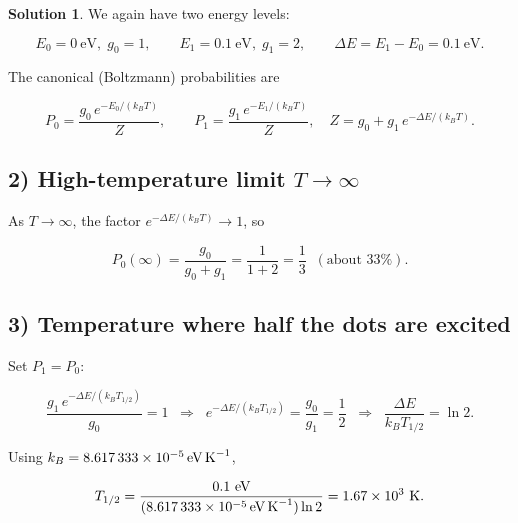 \documentclass[12pt]{article}
\theoremstyle{definition} %
\newtheorem{solution}{Solution}
\theoremstyle{plain} %
\begin{document}
          \begin{solution}
            We again have two energy levels:
            
            \[
            E_0 = 0\ \text{eV},\; g_0 = 1,
            \qquad
            E_1 = 0.1\ \text{eV},\; g_1 = 2,
            \qquad
            \Delta E = E_1-E_0 = 0.1\ \text{eV}.
            \]
            
            The canonical (Boltzmann) probabilities are  
            
            \[
            P_0 = \frac{g_0\,e^{-E_0/(k_BT)}}{Z},\qquad
            P_1 = \frac{g_1\,e^{-E_1/(k_BT)}}{Z},
            \quad
            Z = g_0+g_1\,e^{-\Delta E/(k_BT)}.
            \]
            
            \subsection*{2)  High-temperature limit \(T\to\infty\)}
            
            As \(T\to\infty\), the factor \(e^{-\Delta E/(k_BT)}\to 1\), so  
            
            \[
            P_0(\infty)=\frac{g_0}{g_0+g_1}
                       =\frac{1}{1+2}
                       =\boxed{\dfrac13}\;\;(\text{about }33\%).
            \]
            
            \subsection*{3)  Temperature where half the dots are excited}
            
            Set \(P_1 = P_0\):
            
            \[
            \frac{g_1\,e^{-\Delta E/(k_B T_{1/2})}}
                 {g_0} = 1
            \;\;\Longrightarrow\;\;
            e^{-\Delta E/(k_B T_{1/2})} = \frac{g_0}{g_1} = \frac12
            \;\;\Longrightarrow\;\;
            \frac{\Delta E}{k_B T_{1/2}} = \ln 2 .
            \]
            
            Using \(k_B = 8.617\,333\times10^{-5}\,\text{eV\,K}^{-1}\),
            
            \[
            T_{1/2} = \frac{0.1\ \text{eV}}
                           {(8.617\,333\times10^{-5}\,\text{eV\,K}^{-1})\ln 2}
                     = 1.67\times10^{3}\ \text{K}.
            \]
            

\end{solution}
\end{document}
